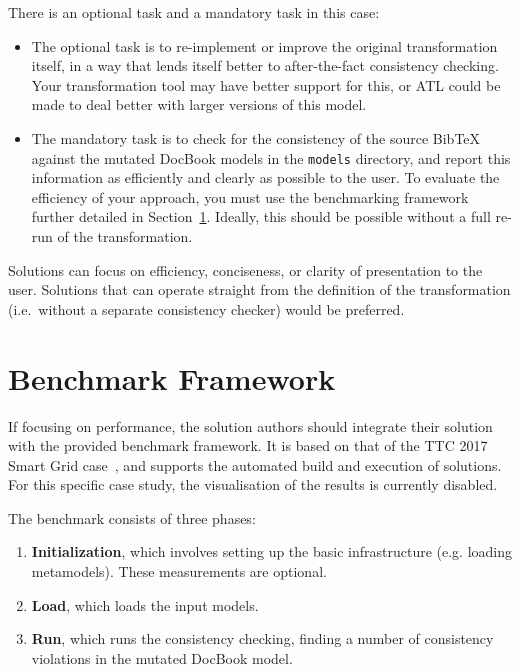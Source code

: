 \documentclass[a4paper]{scrartcl}
\newcommand*{\file}[1]{\texttt{#1}}
\begin{document}
There is an optional task and a mandatory task in this case:

\begin{itemize}
\item The optional task is to re-implement or improve the original
  transformation itself, in a way that lends itself better to after-the-fact
  consistency checking. Your transformation tool may have better support for
  this, or ATL could be made to deal better with larger versions of this model.

\item The mandatory task is to check for the consistency of the source BibTeX
  against the mutated DocBook models in the \file{models} directory, and report
  this information as efficiently and clearly as possible to the user. To
  evaluate the efficiency of your approach, you must use the benchmarking
  framework further detailed in Section~\ref{sec:benchmark-framework}. Ideally,
  this should be possible without a full re-run of the transformation.
\end{itemize}

Solutions can focus on efficiency, conciseness, or clarity of presentation to
the user. Solutions that can operate straight from the definition of the
transformation (i.e.\ without a separate consistency checker) would be preferred.

\section{Benchmark Framework}
\label{sec:benchmark-framework}

If focusing on performance, the solution authors should integrate their solution
with the provided benchmark framework. It is based on that of the TTC 2017 Smart
Grid case~\cite{hinkel_ttc_2017}, and supports the automated build and execution
of solutions. For this specific case study, the visualisation of the results is
currently disabled.

The benchmark consists of three phases:

\begin{enumerate}
\item \textbf{Initialization}, which involves setting up the basic
  infrastructure (e.g. loading metamodels). These measurements are optional.
\item \textbf{Load}, which loads the input models.
\item \textbf{Run}, which runs the consistency checking, finding a number of
  consistency violations in the mutated DocBook model.
\end{enumerate}
\end{document}
